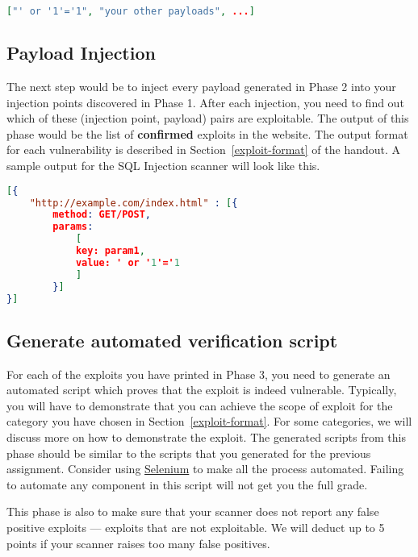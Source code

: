 \documentclass{article}[10pt]
\begin{document}
\begin{lstlisting}[language=json,firstnumber=1]
["' or '1'='1", "your other payloads", ...]
\end{lstlisting}

\subsection{Payload Injection}
The next step would be to inject every payload generated in Phase 2 into your injection points discovered in Phase 1. After each injection, you need to find out which of these (injection point, payload) pairs are exploitable. The output of this phase would be the list of \textbf{confirmed} exploits in the website. The output format for each vulnerability is described in Section~\ref{exploit-format} of the handout. A sample output for the SQL Injection scanner will look like this.
\begin{lstlisting}[language=json,firstnumber=1]
[{
	"http://example.com/index.html" : [{
		method: GET/POST,
		params: 
			[
			key: param1,
			value: ' or '1'='1
			]
		}]
}]
\end{lstlisting}

\subsection{Generate automated verification script} 
For each of the exploits you have printed in Phase 3, you need to generate an
automated script which proves that the exploit is indeed vulnerable. Typically, you will have to demonstrate that you can achieve the scope of exploit for the category you have chosen in Section~\ref{exploit-format}. For some categories, we will discuss more on how to demonstrate the exploit. The
generated scripts from this phase should be similar to the scripts that you
generated for the previous assignment. Consider using
\href{http://www.seleniumhq.org/}{Selenium} to make all the process automated.
Failing to automate any component in this script will not get you the full grade.

This phase is also to make sure that your scanner does not report any false positive exploits --- exploits that are not exploitable. We will deduct up to 5 points if your scanner raises too many false positives.
\end{document}
